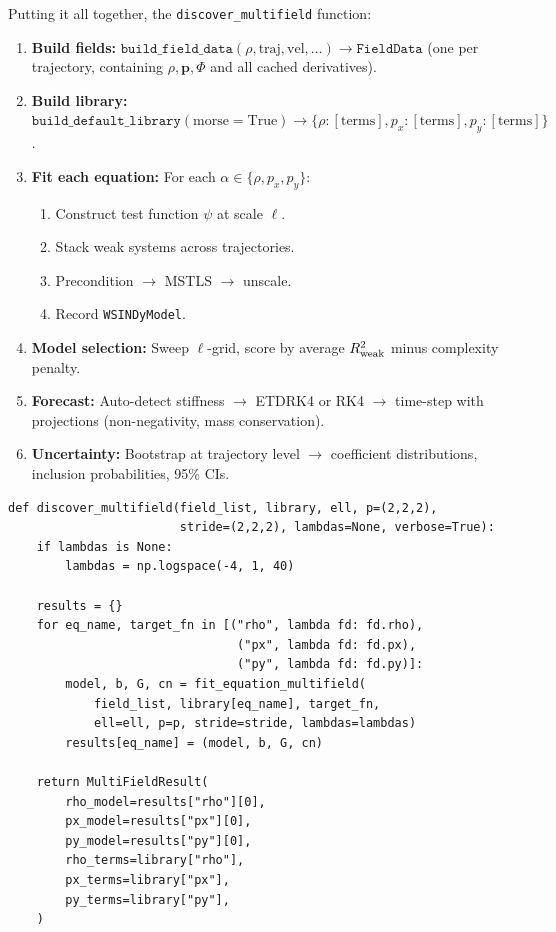 \documentclass[11pt]{article}
\newcommand{\bp}{\mathbf{p}}
\begin{document}
Putting it all together, the \texttt{discover\_multifield} function:

\begin{enumerate}[leftmargin=*]
\item \textbf{Build fields:}
  $\texttt{build\_field\_data}(\rho, \text{traj}, \text{vel}, \ldots) \to \texttt{FieldData}$
  (one per trajectory, containing $\rho, \bp, \Phi$ and all cached derivatives).

\item \textbf{Build library:}
  $\texttt{build\_default\_library}(\text{morse}=\text{True}) \to
  \{\rho: [\text{terms}], p_x: [\text{terms}], p_y: [\text{terms}]\}$.

\item \textbf{Fit each equation:}
  For each $\alpha \in \{\rho, p_x, p_y\}$:
  \begin{enumerate}
    \item Construct test function $\psi$ at scale $\ell$.
    \item Stack weak systems across trajectories.
    \item Precondition $\to$ MSTLS $\to$ unscale.
    \item Record \texttt{WSINDyModel}.
  \end{enumerate}

\item \textbf{Model selection:}
  Sweep $\ell$-grid, score by average $R^2_{\rm weak}$ minus complexity penalty.

\item \textbf{Forecast:}
  Auto-detect stiffness $\to$ ETDRK4 or RK4 $\to$ time-step with
  projections (non-negativity, mass conservation).

\item \textbf{Uncertainty:}
  Bootstrap at trajectory level $\to$ coefficient distributions,
  inclusion probabilities, 95\% CIs.
\end{enumerate}

\begin{lstlisting}[caption={multifield.py --- discover\_multifield}]
def discover_multifield(field_list, library, ell, p=(2,2,2),
                        stride=(2,2,2), lambdas=None, verbose=True):
    if lambdas is None:
        lambdas = np.logspace(-4, 1, 40)

    results = {}
    for eq_name, target_fn in [("rho", lambda fd: fd.rho),
                                ("px", lambda fd: fd.px),
                                ("py", lambda fd: fd.py)]:
        model, b, G, cn = fit_equation_multifield(
            field_list, library[eq_name], target_fn,
            ell=ell, p=p, stride=stride, lambdas=lambdas)
        results[eq_name] = (model, b, G, cn)

    return MultiFieldResult(
        rho_model=results["rho"][0],
        px_model=results["px"][0],
        py_model=results["py"][0],
        rho_terms=library["rho"],
        px_terms=library["px"],
        py_terms=library["py"],
    )
\end{lstlisting}
\end{document}
